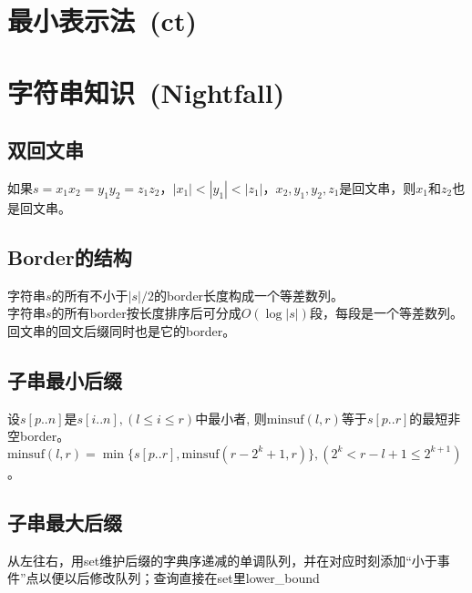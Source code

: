 \section{最小表示法\ \small(ct)}
\section{字符串知识\ \small(Nightfall)}
    \subsection*{双回文串}
        如果$ s = x_1 x_2 = y_1 y_2 = z_1 z_2 $，$ \left|x_1\right| < \left|y_1\right| < \left|z_1\right| $，$ x_2, y_1, y_2, z_1 $是回文串，则$ x_1 $和$ z_2 $也是回文串。
    \subsection*{Border的结构}
        字符串$ s $的所有不小于$ \left|s\right| / 2 $的border长度构成一个等差数列。
        \\字符串$ s $的所有border按长度排序后可分成$ O(\log \left| s \right|) $段，每段是一个等差数列。
        \\回文串的回文后缀同时也是它的border。
    \subsection*{子串最小后缀}
        设$ s[p..n] $是$ s[i..n], (l \leq i \leq r) $中最小者, 则$ \text{minsuf}(l, r) $等于$ s[p..r] $的最短非空border。$ \text{minsuf}(l, r) = \min \lbrace s[p..r], \text{minsuf}(r - 2^k + 1, r) \rbrace, (2^k < r - l + 1 \leq 2^{k + 1} ) $。
    \subsection*{子串最大后缀}
        从左往右，用set维护后缀的字典序递减的单调队列，并在对应时刻添加“小于事件”点以便以后修改队列；查询直接在set里lower\_bound

